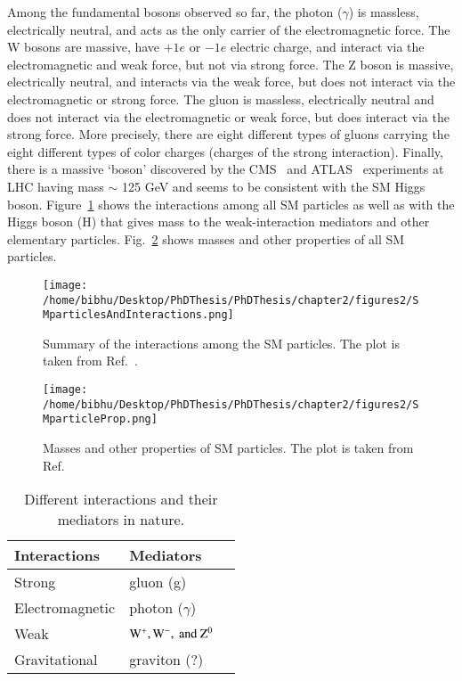 Among the fundamental bosons observed so far, the photon ($\gamma$) is massless, electrically neutral, and acts as the only carrier of the electromagnetic force. The W bosons are massive, have $+1e$ or $-1e$ electric charge, and interact via the electromagnetic and weak force, but not via strong force. The Z boson is massive, electrically neutral, and interacts via the weak force, but does not interact via the electromagnetic or strong force. The gluon is massless, electrically neutral and does not interact via the electromagnetic or weak force, but does interact via the strong force. More precisely, there are eight different types of gluons carrying the eight different types of color charges (charges of the strong interaction). Finally, there is a massive `boson' discovered by the CMS~\cite{cms-higgs} and ATLAS~\cite{atlas-higgs} experiments at LHC having mass $\sim$ 125 GeV and seems to be consistent with the SM Higgs boson. Figure~\ref{fig:standard_modelPart} shows the interactions among all SM particles as well as with the Higgs boson (H) that gives mass to the weak-interaction mediators and other elementary particles. Fig.~\ref{fig:SMproperties} shows masses and other properties of all SM particles.
\begin{figure}[h]
    \centering
    \texttt{[image: /home/bibhu/Desktop/PhDThesis/PhDThesis/chapter2/figures2/SMparticlesAndInteractions.png]}
    \caption{\small{Summary of the interactions among the SM particles. The plot is taken from Ref.~\cite{SMandParticles}}.}
    \label{fig:standard_modelPart}
\end{figure}


\begin{figure}[h]
    \centering
    \texttt{[image: /home/bibhu/Desktop/PhDThesis/PhDThesis/chapter2/figures2/SMparticleProp.png]}
    \caption{\small{Masses and other properties of SM particles. The plot is taken from Ref.~\cite{SMandParticles}}}
    \label{fig:SMproperties}
\end{figure}



\begin{table}
\caption{\small{Different interactions and their mediators in nature.}} 
\begin{center}
\begin{tabular}{ | l | l | p{1.5cm}|}
    \hline
     \bf{Interactions} & \bf{Mediators} \\ \hline \hline
     Strong & gluon (g) \\ \hline
     Electromagnetic & photon ($\gamma$) \\ \hline
     Weak & $\rm W^{+}, W^{-}, ~and~ Z^{0}$ \\ \hline 
     Gravitational & graviton (?) \\ \hline
\end {tabular}
\label{Table:Interaction}
\end{center}
\end{table}
